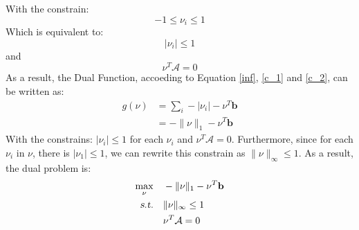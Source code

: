 \documentclass[10pt,a4paper]{article}
\begin{document}
With the constrain:
\begin{equation*}
	-1 \leq \nu_{i} \leq 1
\end{equation*}
Which is equivalent to:
\begin{equation}
	|\nu_{i}| \leq 1
	\label{c_1}
\end{equation}
and 
\begin{equation}
	\nu^{T} \mathcal{A} = 0
	\label{c_2}
\end{equation}
As a result, the Dual Function, accoeding to Equation \ref{inf}, \ref{c_1} and \ref{c_2},  can be written as:
\begin{equation}
	\begin{aligned}
		g(\nu) &= \displaystyle\sum_{i} -|\nu_{i}| - \nu^{T} \mathbf{b} \\
		&= - \| \nu \|_{1} - \nu^{T} \mathbf{b}
	\end{aligned}
\end{equation}
With the constrains: $|\nu_{i}| \leq 1$ for each $\nu_{i}$ and $\nu^{T} \mathcal{A} = 0$. Furthermore, since for each $\nu_{i}$ in $\nu$, there is $ |\nu_{1}| \leq 1$, we can rewrite this constrain as $\| \nu \|_{\infty} \leq 1$. As a result, the dual problem is:
\begin{equation*}
	\begin{aligned}
		\displaystyle\max_{\nu} \quad & - \| \nu \|_{1} - \nu^{T} \mathbf{b} \\
		\textsl{s.t.}  \quad & \| \nu \|_{\infty} \leq 1 \\
		& \nu^{T} \mathcal{A} = 0
	\end{aligned}
\end{equation*}
\end{document}
